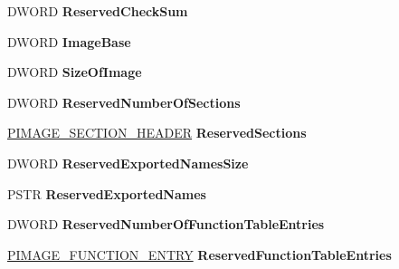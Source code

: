 \begin{DoxyCompactItemize}
D\+W\+O\+RD {\bfseries Reserved\+Check\+Sum}
\item 
\mbox{\label{struct___i_m_a_g_e___d_e_b_u_g___i_n_f_o_r_m_a_t_i_o_n_a56f033b0832e5f2da2b562952d29f98e}} 
D\+W\+O\+RD {\bfseries Image\+Base}
\item 
\mbox{\label{struct___i_m_a_g_e___d_e_b_u_g___i_n_f_o_r_m_a_t_i_o_n_a9aa9e18f1f8413c3f7cefa7286a9ef9d}} 
D\+W\+O\+RD {\bfseries Size\+Of\+Image}
\item 
\mbox{\label{struct___i_m_a_g_e___d_e_b_u_g___i_n_f_o_r_m_a_t_i_o_n_a972e4db756c23c4f51cfa00afa3dd7e9}} 
D\+W\+O\+RD {\bfseries Reserved\+Number\+Of\+Sections}
\item 
\mbox{\label{struct___i_m_a_g_e___d_e_b_u_g___i_n_f_o_r_m_a_t_i_o_n_af520b3817e9579daabba41ae5282d449}} 
\hyperlink{struct___i_m_a_g_e___s_e_c_t_i_o_n___h_e_a_d_e_r}{P\+I\+M\+A\+G\+E\+\_\+\+S\+E\+C\+T\+I\+O\+N\+\_\+\+H\+E\+A\+D\+ER} {\bfseries Reserved\+Sections}
\item 
\mbox{\label{struct___i_m_a_g_e___d_e_b_u_g___i_n_f_o_r_m_a_t_i_o_n_aefc657171fae138be9a0b67acd0f4c71}} 
D\+W\+O\+RD {\bfseries Reserved\+Exported\+Names\+Size}
\item 
\mbox{\label{struct___i_m_a_g_e___d_e_b_u_g___i_n_f_o_r_m_a_t_i_o_n_a3ae6d6f4ee78f8522d1393e724cfe317}} 
P\+S\+TR {\bfseries Reserved\+Exported\+Names}
\item 
\mbox{\label{struct___i_m_a_g_e___d_e_b_u_g___i_n_f_o_r_m_a_t_i_o_n_a975d650e55a0ecf9be13c8e4d8fb9d08}} 
D\+W\+O\+RD {\bfseries Reserved\+Number\+Of\+Function\+Table\+Entries}
\item 
\mbox{\label{struct___i_m_a_g_e___d_e_b_u_g___i_n_f_o_r_m_a_t_i_o_n_a3057361ee0efafb2f820e5fb64c00dc1}} 
\hyperlink{struct___i_m_a_g_e___f_u_n_c_t_i_o_n___e_n_t_r_y}{P\+I\+M\+A\+G\+E\+\_\+\+F\+U\+N\+C\+T\+I\+O\+N\+\_\+\+E\+N\+T\+RY} {\bfseries Reserved\+Function\+Table\+Entries}

\end{DoxyCompactItemize}
